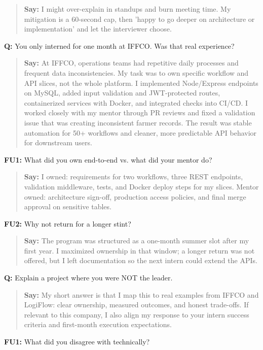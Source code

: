 \documentclass[9pt,a4paper]{article}
\begin{document}
\begin{quote}\small\textbf{Say:} I might over-explain in standups and burn meeting time. My mitigation is a 60-second cap, then 'happy to go deeper on architecture or implementation' and let the interviewer choose.\end{quote}
\vspace{2mm}
\textbf{Q:} You only interned for one month at IFFCO. Was that real experience?

\begin{quote}\small\textbf{Say:} At IFFCO, operations teams had repetitive daily processes and frequent data inconsistencies. My task was to own specific workflow and API slices, not the whole platform. I implemented Node/Express endpoints on MySQL, added input validation and JWT-protected routes, containerized services with Docker, and integrated checks into CI/CD. I worked closely with my mentor through PR reviews and fixed a validation issue that was creating inconsistent farmer records. The result was stable automation for 50+ workflows and cleaner, more predictable API behavior for downstream users.\end{quote}
\vspace{2mm}
\textbf{FU1:} What did you own end-to-end vs. what did your mentor do?

\begin{quote}\small\textbf{Say:} I owned: requirements for two workflows, three REST endpoints, validation middleware, tests, and Docker deploy steps for my slices. Mentor owned: architecture sign-off, production access policies, and final merge approval on sensitive tables.\end{quote}
\vspace{2mm}
\textbf{FU2:} Why not return for a longer stint?

\begin{quote}\small\textbf{Say:} The program was structured as a one-month summer slot after my first year. I maximized ownership in that window; a longer return was not offered, but I left documentation so the next intern could extend the APIs.\end{quote}
\vspace{2mm}
\textbf{Q:} Explain a project where you were NOT the leader.

\begin{quote}\small\textbf{Say:} My short answer is that I map this to real examples from IFFCO and LogiFlow: clear ownership, measured outcomes, and honest trade-offs. If relevant to this company, I also align my response to your intern success criteria and first-month execution expectations.\end{quote}
\vspace{2mm}
\textbf{FU1:} What did you disagree with technically?
\end{document}
